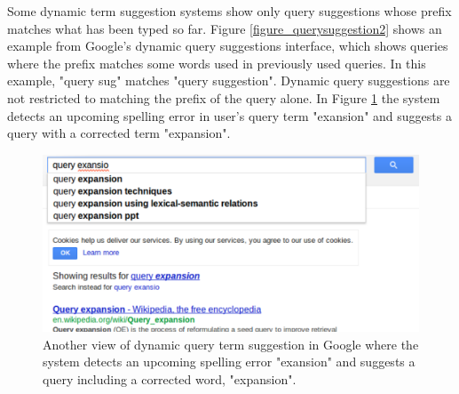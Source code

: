\documentclass{sigchi}
\begin{document}
Some dynamic term suggestion systems show only query suggestions whose prefix matches what has been typed so far. Figure \ref{figure_querysuggestion2} shows an example from Google's dynamic query suggestions interface, which shows queries where the prefix matches some words used in previously used queries. In this example, "query sug" matches "query suggestion". Dynamic query suggestions are not restricted to matching the prefix of the query alone. In Figure \ref{figure_querysuggestion3} the system detects an upcoming spelling error in user's query term "exansion" and suggests a query with a corrected term "expansion". 
\begin{figure}[htp] %
\caption{Another view of dynamic query term suggestion in Google where the system detects an upcoming spelling error "exansion" and suggests a query including a corrected word, "expansion". \protect} \label{figure_querysuggestion3}
\includegraphics[scale=0.41]{figures/dynamicQueryTermSuggestion3.pdf} 
\end{figure}
\end{document}
